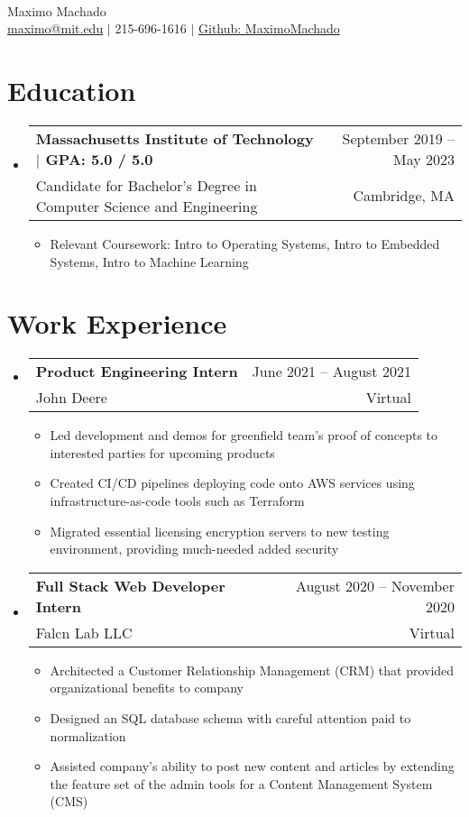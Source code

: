 \documentclass[letterpaper,12pt]{article} %
\makeatletter
\newcommand{\CVItem}[1]{
  \item\small{
    {#1 \vspace{-2pt}}
  }
}
\newcommand{\CVSubheading}[4]{
  \vspace{-2pt}\item
    \begin{tabular*}{0.97\textwidth}[t]{l@{\extracolsep{\fill}}r}
      \textbf{#1} & #2 \\
      \small#3 & \small #4 \\
    \end{tabular*}\vspace{-7pt}
}
\newcommand{\CVSubHeadingListStart}{\begin{itemize}[leftmargin=0.15in, label={}]} %
\newcommand{\CVSubHeadingListEnd}{\end{itemize}}
\newcommand{\CVItemListStart}{\begin{itemize}}
\newcommand{\CVItemListEnd}{\end{itemize}\vspace{-5pt}}
\makeatother
\begin{document}

\begin{minipage}[c]{0.05\textwidth}
  \-\
\end{minipage}

\begin{center}
  \Huge Maximo Machado \\ \vspace{1pt} %
  \small
  \href{mailto:maximo@mit.edu}{maximo@mit.edu} $|$
  215-696-1616 $|$
  \href{https://github.com/MaximoMachado}{Github: MaximoMachado}
\end{center}
\vspace{-10pt} %

\section{Education}
\CVSubHeadingListStart
\CVSubheading
{{Massachusetts Institute of Technology $|$ \small{GPA: 5.0 / 5.0}}}{September 2019 -- May 2023}
{Candidate for Bachelor's Degree in Computer Science and Engineering}{Cambridge, MA}

\CVItemListStart
\CVItem{Relevant Coursework:
  Intro to Operating Systems,
  Intro to Embedded Systems,
  Intro to Machine Learning}
\CVItemListEnd
\CVSubHeadingListEnd

\vspace{-10pt} %
\section{Work Experience}
\CVSubHeadingListStart
\CVSubheading
{Product Engineering Intern}{June 2021 -- August 2021}
{John Deere}{Virtual}
\CVItemListStart
\CVItem{Led development and demos for greenfield team's proof of concepts to interested parties for upcoming products}
\CVItem{Created CI/CD pipelines deploying code onto AWS services using infrastructure-as-code tools such as Terraform}
\CVItem{Migrated essential licensing encryption servers to new testing environment, providing much-needed added security}
\CVItemListEnd
\CVSubheading
{Full Stack Web Developer Intern}{August 2020 -- November 2020}
{Falcn Lab LLC}{Virtual}
\CVItemListStart
\CVItem{Architected a Customer Relationship Management (CRM) that provided organizational benefits to company}
\CVItem{Designed an SQL database schema with careful attention paid to normalization}
\CVItem{Assisted company's ability to post new content and articles by extending the feature set of the admin tools for a Content Management System (CMS)}
\CVItemListEnd
\CVSubHeadingListEnd
\end{document}
